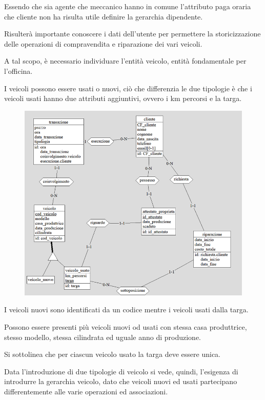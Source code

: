 \documentclass[a4paper,12pt]{report}
\begin{document}
Essendo che sia agente che meccanico hanno in comune l’attributo paga oraria che cliente non ha risulta utile definire la gerarchia
%
dipendente.

Risulterà importante conoscere i dati dell’utente per permettere la storicizzazione delle operazioni di compravendita e riparazione 
%
dei vari veicoli.

A tal scopo, è necessario individuare l’entità veicolo, entità fondamentale per l’officina.

I veicoli possono essere usati o nuovi, ciò che differenzia le due tipologie è che i veicoli usati hanno due attributi aggiuntivi, 
%
ovvero i km percorsi e la targa.

	\begin{figure}[H]
		\centering
		\includegraphics[scale=1]{img/raffinamenti.png}
	\end{figure}

I veicoli nuovi sono identificati da un codice mentre i veicoli usati dalla targa.

Possono essere presenti più veicoli nuovi od usati con stessa casa produttrice, stesso modello, stessa cilindrata ed uguale anno di produzione.

Si sottolinea che per ciascun veicolo usato la targa deve essere unica.

Data l’introduzione di due tipologie di veicolo si vede, quindi, l’esigenza di introdurre la gerarchia veicolo, dato che veicoli 
%
nuovi ed usati partecipano differentemente alle varie operazioni ed associazioni.
\end{document}
